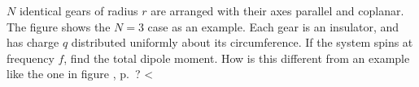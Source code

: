 $N$ identical gears of radius $r$ are arranged with their axes parallel and coplanar. The figure shows
the $N=3$ case as an example. Each gear is an insulator, and has charge $q$
distributed uniformly about its circumference. If the system spins at frequency $f$,
find the total dipole moment. How is this different from an example like the one
in figure , p.~\pageref{fig:potato-chip}? <%
